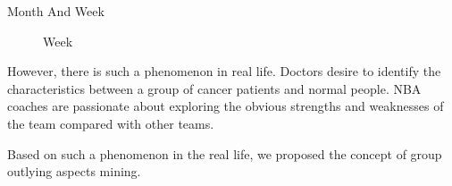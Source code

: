\documentclass[
 size=12pt,
 paper=smartboard,  %
 mode=present, 		%
 display=slides, 	%
 style=tuliplab,  	%
 pauseslide,
 fleqn,leqno]{powerdot}
\begin{document}
\begin{slide}{Month And Week}
{\begin{figure}
    \caption{Week}
  \end{figure}
  }
\begin{note}
However,
there is such a phenomenon in real life.
Doctors desire to identify the characteristics between
a group of cancer patients and normal people.
NBA coaches are passionate about exploring the obvious strengths and
weaknesses of the team compared with other teams.

Based on such a phenomenon in the real life,
we proposed the concept of group outlying aspects mining.
\end{note}
\end{slide}
\end{document}
